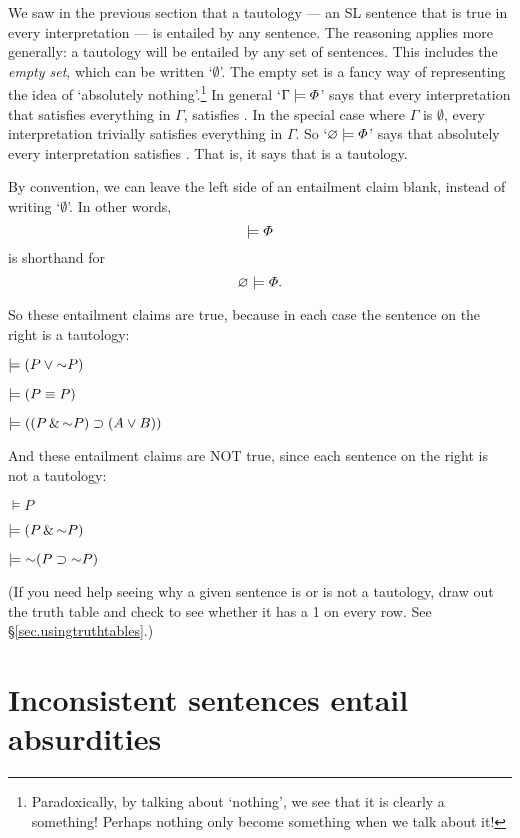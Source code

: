 {{We saw in the previous section that a tautology ---  an SL sentence that is true in every interpretation --- is entailed by any sentence. The reasoning applies more generally: a tautology will be entailed by any set of sentences. This includes the \emph{empty set}, which can be written `$\emptyset$'. {\color{black} The empty set is a fancy way of representing the idea of `absolutely nothing'.}\footnote{{\color{black} Paradoxically, by talking about `nothing', we see that it is clearly a something! Perhaps nothing only become something when we talk about it!}} In general `$\Gamma \models \varPhi{}$' says that every interpretation that satisfies everything in $\Gamma$, satisfies \metaA{}. In the special case where $\Gamma$ is $\emptyset$, every interpretation trivially satisfies everything in $\Gamma$. So `$\varnothing \models \varPhi{}$' says that absolutely every interpretation satisfies \metaA{}. That is, it says that \metaA{} is a tautology.

By convention, we can leave the left side of an entailment claim blank, instead of writing `$\emptyset$'. In other words, $$\models \varPhi{} $$ is shorthand for $$ \varnothing \models \varPhi{}.$$

So these entailment claims are true, because in each case the sentence on the right is a tautology:

\begin{earg}
\item[] $\models (P \eor \enot P)$
\item[] $\models (P \equiv P)$
\item[] $\models ((P \eand\enot P)\eif (A \eor B))$
\end{earg}

And these entailment claims are NOT true, since each sentence on the right is not a tautology:

\begin{earg}
\item[] $\models P$
\item[] $\models (P \eand \enot P)$
\item[] $\models \enot(P \eif \enot P)$
\end{earg}

(If you need help seeing why a given sentence is or is not a tautology, draw out the truth table and check to see whether it has a 1 on every row. See \S\ref{sec.usingtruthtables}.)

\section{Inconsistent sentences entail absurdities}

}}
